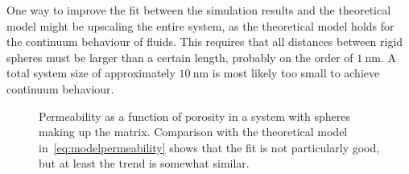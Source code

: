 \documentclass[11pt,british,a4paper]{report}
\begin{document}
One way to improve the fit between the simulation results and the theoretical model might be upscaling the entire system, as the theoretical model holds for the continuum behaviour of fluids. This requires that all distances between rigid spheres must be larger than a certain length, probably on the order of \(\SI{1}{\nano\m}\). A total system size of approximately \(\SI{10}{\nano\m}\) is most likely too small to achieve continuum behaviour.
\begin{figure}[H]
    \centering
    \caption{Permeability as a function of porosity in a system with spheres making up the matrix. Comparison with the theoretical model in~\vref{eq:modelpermeability} shows that the fit is not particularly good, but at least the trend is somewhat similar.}%
    \label{fig:permeability}
\end{figure}


































\nocite{*}
\printbibliography{}
\end{document}
